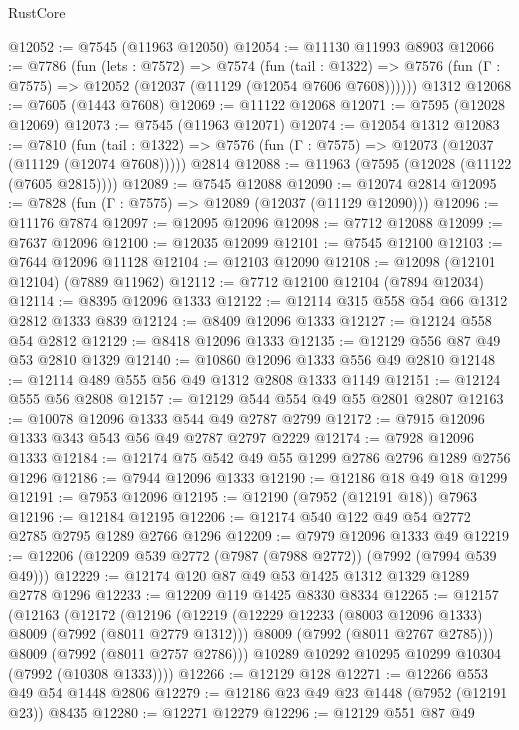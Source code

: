 \begin{lexlean}{RustCore}
\begin{coremodule}
@12052 := @7545 (@11963 @12050)
@12054 := @11130 @11993 @8903
@12066 := @7786
    (fun (lets : @7572) =>
    @7574
      (fun (tail : @1322) =>
      @7576 (fun (Γ : @7575) => @12052 (@12037 (@11129 (@12054 @7606 @7608))))))
    @1312
@12068 := @7605 (@1443 @7608)
@12069 := @11122 @12068
@12071 := @7595 (@12028 @12069)
@12073 := @7545 (@11963 @12071)
@12074 := @12054 @1312
@12083 := @7810
    (fun (tail : @1322) => @7576 (fun (Γ : @7575) => @12073 (@12037 (@11129 (@12074 @7608)))))
    @2814
@12088 := @11963 (@7595 (@12028 (@11122 (@7605 @2815))))
@12089 := @7545 @12088
@12090 := @12074 @2814
@12095 := @7828 (fun (Γ : @7575) => @12089 (@12037 (@11129 @12090)))
@12096 := @11176 @7874
@12097 := @12095 @12096
@12098 := @7712 @12088
@12099 := @7637 @12096
@12100 := @12035 @12099
@12101 := @7545 @12100
@12103 := @7644 @12096 @11128
@12104 := @12103 @12090
@12108 := @12098 (@12101 @12104) (@7889 @11962)
@12112 := @7712 @12100 @12104 (@7894 @12034)
@12114 := @8395 @12096 @1333
@12122 := @12114 @315 @558 @54 @66 @1312 @2812 @1333 @839
@12124 := @8409 @12096 @1333
@12127 := @12124 @558 @54 @2812
@12129 := @8418 @12096 @1333
@12135 := @12129 @556 @87 @49 @53 @2810 @1329
@12140 := @10860 @12096 @1333 @556 @49 @2810
@12148 := @12114 @489 @555 @56 @49 @1312 @2808 @1333 @1149
@12151 := @12124 @555 @56 @2808
@12157 := @12129 @544 @554 @49 @55 @2801 @2807
@12163 := @10078 @12096 @1333 @544 @49 @2787 @2799
@12172 := @7915 @12096 @1333 @343 @543 @56 @49 @2787 @2797 @2229
@12174 := @7928 @12096 @1333
@12184 := @12174 @75 @542 @49 @55 @1299 @2786 @2796 @1289 @2756 @1296
@12186 := @7944 @12096 @1333
@12190 := @12186 @18 @49 @18 @1299
@12191 := @7953 @12096
@12195 := @12190 (@7952 (@12191 @18)) @7963
@12196 := @12184 @12195
@12206 := @12174 @540 @122 @49 @54 @2772 @2785 @2795 @1289 @2766 @1296
@12209 := @7979 @12096 @1333 @49
@12219 := @12206 (@12209 @539 @2772 (@7987 (@7988 @2772)) (@7992 (@7994 @539 @49)))
@12229 := @12174 @120 @87 @49 @53 @1425 @1312 @1329 @1289 @2778 @1296
@12233 := @12209 @119 @1425 @8330 @8334
@12265 := @12157
    (@12163
      (@12172
        (@12196
          (@12219
            (@12229 @12233 (@8003 @12096 @1333) @8009 (@7992 (@8011 @2779 @1312)))
            @8009
            (@7992 (@8011 @2767 @2785)))
          @8009
          (@7992 (@8011 @2757 @2786)))
        @10289
        @10292
        @10295
        @10299
        @10304
        (@7992 (@10308 @1333))))
@12266 := @12129 @128
@12271 := @12266 @553 @49 @54 @1448 @2806
@12279 := @12186 @23 @49 @23 @1448 (@7952 (@12191 @23)) @8435
@12280 := @12271 @12279
@12296 := @12129
    @551
    @87
    @49

\end{coremodule}
\end{lexlean}
